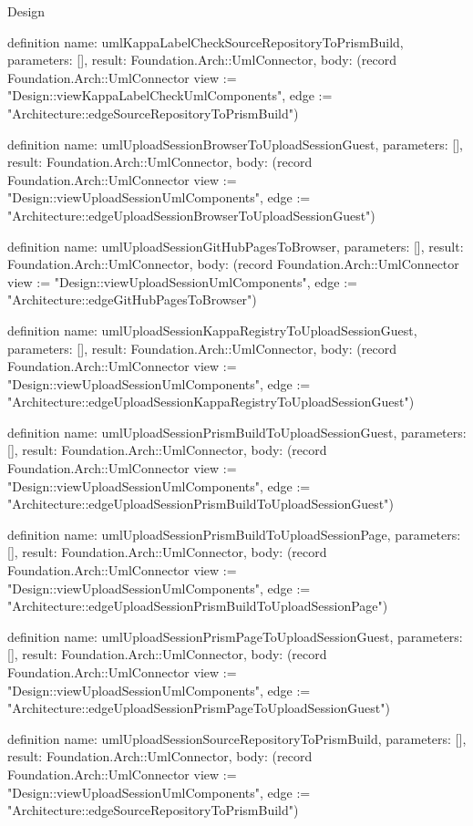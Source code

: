 \begin{lexlean}{Design}
\begin{semanticmodule}
definition{
  name: umlKappaLabelCheckSourceRepositoryToPrismBuild,
  parameters: [],
  result: Foundation.Arch::UmlConnector,
  body: (record Foundation.Arch::UmlConnector {view := "Design::viewKappaLabelCheckUmlComponents", edge := "Architecture::edgeSourceRepositoryToPrismBuild"})
}

definition{
  name: umlUploadSessionBrowserToUploadSessionGuest,
  parameters: [],
  result: Foundation.Arch::UmlConnector,
  body: (record Foundation.Arch::UmlConnector {view := "Design::viewUploadSessionUmlComponents", edge := "Architecture::edgeUploadSessionBrowserToUploadSessionGuest"})
}

definition{
  name: umlUploadSessionGitHubPagesToBrowser,
  parameters: [],
  result: Foundation.Arch::UmlConnector,
  body: (record Foundation.Arch::UmlConnector {view := "Design::viewUploadSessionUmlComponents", edge := "Architecture::edgeGitHubPagesToBrowser"})
}

definition{
  name: umlUploadSessionKappaRegistryToUploadSessionGuest,
  parameters: [],
  result: Foundation.Arch::UmlConnector,
  body: (record Foundation.Arch::UmlConnector {view := "Design::viewUploadSessionUmlComponents", edge := "Architecture::edgeUploadSessionKappaRegistryToUploadSessionGuest"})
}

definition{
  name: umlUploadSessionPrismBuildToUploadSessionGuest,
  parameters: [],
  result: Foundation.Arch::UmlConnector,
  body: (record Foundation.Arch::UmlConnector {view := "Design::viewUploadSessionUmlComponents", edge := "Architecture::edgeUploadSessionPrismBuildToUploadSessionGuest"})
}

definition{
  name: umlUploadSessionPrismBuildToUploadSessionPage,
  parameters: [],
  result: Foundation.Arch::UmlConnector,
  body: (record Foundation.Arch::UmlConnector {view := "Design::viewUploadSessionUmlComponents", edge := "Architecture::edgeUploadSessionPrismBuildToUploadSessionPage"})
}

definition{
  name: umlUploadSessionPrismPageToUploadSessionGuest,
  parameters: [],
  result: Foundation.Arch::UmlConnector,
  body: (record Foundation.Arch::UmlConnector {view := "Design::viewUploadSessionUmlComponents", edge := "Architecture::edgeUploadSessionPrismPageToUploadSessionGuest"})
}

definition{
  name: umlUploadSessionSourceRepositoryToPrismBuild,
  parameters: [],
  result: Foundation.Arch::UmlConnector,
  body: (record Foundation.Arch::UmlConnector {view := "Design::viewUploadSessionUmlComponents", edge := "Architecture::edgeSourceRepositoryToPrismBuild"})
}


\end{semanticmodule}
\end{lexlean}
